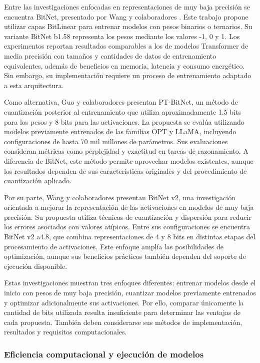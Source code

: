 Entre las investigaciones enfocadas en representaciones de muy baja precisión se encuentra BitNet, presentado por Wang y colaboradores \cite{bitnetJMLR2025}. Este trabajo propone utilizar capas BitLinear para entrenar modelos con pesos binarios o ternarios. Su variante BitNet b1.58 representa los pesos mediante los valores -1, 0 y 1. Los experimentos reportan resultados comparables a los de modelos Transformer de media precisión con tamaños y cantidades de datos de entrenamiento equivalentes, además de beneficios en memoria, latencia y consumo energético. Sin embargo, su implementación requiere un proceso de entrenamiento adaptado a esta arquitectura.

Como alternativa, Guo y colaboradores \cite{ptBitnet2025} presentan PT-BitNet, un método de cuantización posterior al entrenamiento que utiliza aproximadamente 1.5 bits para los pesos y 8 bits para las activaciones. La propuesta se evalúa utilizando modelos previamente entrenados de las familias OPT y LLaMA, incluyendo configuraciones de hasta 70 mil millones de parámetros. Sus evaluaciones consideran métricas como perplejidad y exactitud en tareas de razonamiento. A diferencia de BitNet, este método permite aprovechar modelos existentes, aunque los resultados dependen de sus características originales y del procedimiento de cuantización aplicado.

Por su parte, Wang y colaboradores \cite{bitnetV22026} presentan BitNet v2, una investigación orientada a mejorar la representación de las activaciones en modelos de muy baja precisión. Su propuesta utiliza técnicas de cuantización y dispersión para reducir los errores asociados con valores atípicos. Entre sus configuraciones se encuentra BitNet v2 a4.8, que combina representaciones de 4 y 8 bits en distintas etapas del procesamiento de activaciones. Este enfoque amplía las posibilidades de optimización, aunque sus beneficios prácticos también dependen del soporte de ejecución disponible.

Estas investigaciones muestran tres enfoques diferentes: entrenar modelos desde el inicio con pesos de muy baja precisión, cuantizar modelos previamente entrenados y optimizar adicionalmente sus activaciones. Por ello, comparar únicamente la cantidad de bits utilizada resulta insuficiente para determinar las ventajas de cada propuesta. También deben considerarse sus métodos de implementación, resultados y requisitos computacionales.


\subsubsection{Eficiencia computacional y ejecución de modelos}

